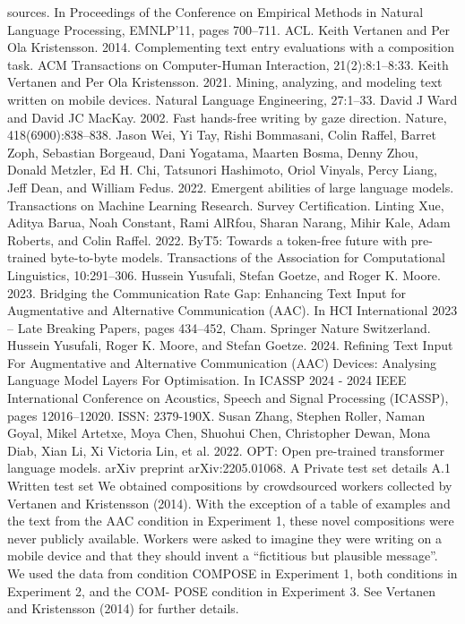 sources. In Proceedings of the Conference on Empirical Methods in Natural Language Processing,
EMNLP’11, pages 700–711. ACL.
Keith Vertanen and Per Ola Kristensson. 2014. Complementing text entry evaluations with a composition
task. ACM Transactions on Computer-Human Interaction, 21(2):8:1–8:33.
Keith Vertanen and Per Ola Kristensson. 2021. Mining, analyzing, and modeling text written on mobile
devices. Natural Language Engineering, 27:1–33.
David J Ward and David JC MacKay. 2002. Fast
hands-free writing by gaze direction. Nature,
418(6900):838–838.
Jason Wei, Yi Tay, Rishi Bommasani, Colin Raffel,
Barret Zoph, Sebastian Borgeaud, Dani Yogatama,
Maarten Bosma, Denny Zhou, Donald Metzler, Ed H.
Chi, Tatsunori Hashimoto, Oriol Vinyals, Percy
Liang, Jeff Dean, and William Fedus. 2022. Emergent abilities of large language models. Transactions
on Machine Learning Research. Survey Certification.
Linting Xue, Aditya Barua, Noah Constant, Rami AlRfou, Sharan Narang, Mihir Kale, Adam Roberts,
and Colin Raffel. 2022. ByT5: Towards a token-free
future with pre-trained byte-to-byte models. Transactions of the Association for Computational Linguistics, 10:291–306.
Hussein Yusufali, Stefan Goetze, and Roger K. Moore.
2023. Bridging the Communication Rate Gap: Enhancing Text Input for Augmentative and Alternative Communication (AAC). In HCI International
2023 – Late Breaking Papers, pages 434–452, Cham.
Springer Nature Switzerland.
Hussein Yusufali, Roger K. Moore, and Stefan Goetze.
2024. Refining Text Input For Augmentative and Alternative Communication (AAC) Devices: Analysing
Language Model Layers For Optimisation. In
ICASSP 2024 - 2024 IEEE International Conference on Acoustics, Speech and Signal Processing
(ICASSP), pages 12016–12020. ISSN: 2379-190X.
Susan Zhang, Stephen Roller, Naman Goyal, Mikel
Artetxe, Moya Chen, Shuohui Chen, Christopher Dewan, Mona Diab, Xian Li, Xi Victoria Lin, et al. 2022.
OPT: Open pre-trained transformer language models.
arXiv preprint arXiv:2205.01068.
A Private test set details
A.1 Written test set
We obtained compositions by crowdsourced workers collected by Vertanen and Kristensson (2014).
With the exception of a table of examples and the
text from the AAC condition in Experiment 1, these
novel compositions were never publicly available.
Workers were asked to imagine they were writing
on a mobile device and that they should invent
a “fictitious but plausible message”. We used the
data from condition COMPOSE in Experiment 1,
both conditions in Experiment 2, and the COM-
POSE condition in Experiment 3. See Vertanen and
Kristensson (2014) for further details.
